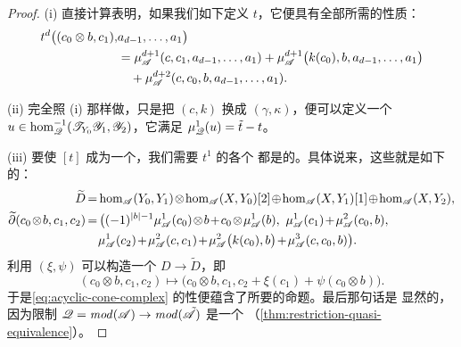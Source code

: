 \begin{proof}
(i) 直接计算表明，如果我们如下定义 $t$，它便具有全部所需的性质：
\begin{equation*}
\begin{aligned}
t^d\bigl((c_0\otimes b,c_1),&a_{d-1},\ldots,a_1\bigr)\\
&=\mu^{d+1}_{\mathscr{A}}(c,c_1,a_{d-1},\ldots,a_1)
+\mu^{d+1}_{\mathscr{A}}\bigl(k(c_0),b,a_{d-1},\ldots,a_1\bigr)\\
&\quad+\mu^{d+2}_{\mathscr{A}}(c,c_0,b,a_{d-1},\ldots,a_1).
\end{aligned}
\end{equation*}

(ii) 完全照 (i) 那样做，只是把 $(c,k)$ 换成 $(\gamma,\kappa)$，便可以定义一个
$u\in\hom^{-1}_{\mathscr{Q}}(\mathscr{T}_{Y_0}\mathscr{Y}_1,\mathscr{Y}_2)$，它满足
$\mu^1_{\mathscr{Q}}(u)=\tilde{t}-t$。

(iii) 要使 $[t]$ 成为一个\trIsomorphism，我们需要 $t^1$ 的各个\trMappingCone{}%
都是\trAcyclic{}的。具体说来，这些\trCone{}就是如下的\trChainComplex：
\begin{equation*}
\medmuskip=1.5mu\relax\thickmuskip=3mu\relax
\begin{aligned}
\widetilde{D}&=\hom_{\scr{A}}(Y_0,Y_1)\otimes\hom_{\scr{A}}(X,Y_0)[2]
\oplus\hom_{\scr{A}}(X,Y_1)[1]\oplus\hom_{\scr{A}}(X,Y_2),\\
\widetilde{\partial}(c_0\otimes b,c_1,c_2)
&=\bigl((-1)^{|b|-1}\mu^1_{\scr{A}}(c_0)\otimes b
+c_0\otimes\mu^1_{\scr{A}}(b),\
\mu^1_{\scr{A}}(c_1)+\mu^2_{\scr{A}}(c_0,b),\\
&\quad\mu^1_{\scr{A}}(c_2)+\mu^2_{\scr{A}}(c,c_1)
+\mu^2_{\scr{A}}\bigl(k(c_0),b\bigr)+\mu^3_{\scr{A}}(c,c_0,b)\bigr).
\end{aligned}
\end{equation*}
利用 $(\xi,\psi)$ 可以构造一个\trIsomorphism{} $D\to\widetilde{D}$，即
\begin{equation*}
(c_0\otimes b,c_1,c_2)\longmapsto
\bigl(c_0\otimes b,c_1,c_2+\xi(c_1)+\psi(c_0\otimes b)\bigr).
\end{equation*}
于是\eqref{eq:acyclic-cone-complex} 的\trAcyclic{}性便蕴含了所要的命题。最后那句话是
显然的，因为限制\trFunctor{} $\mathscr{Q}=\mathit{mod}(\mathscr{A})\to
\mathit{mod}(\tilde{\mathscr{A}})$ 是一个\trQuasiequivalence
（\cref{thm:restriction-quasi-equivalence}）。
\end{proof}

